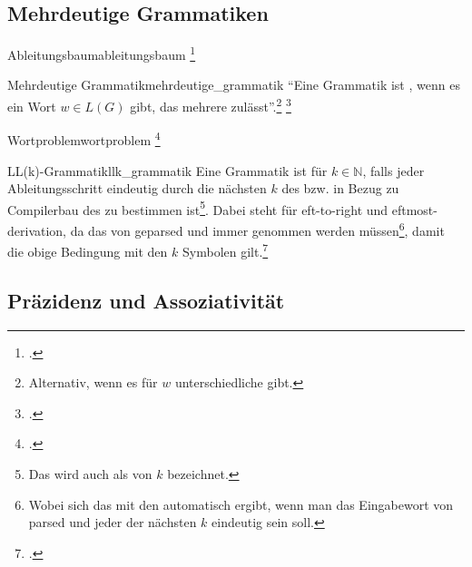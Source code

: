 \subsection{Mehrdeutige Grammatiken}
\begin{Definition}{Ableitungsbaum}{ableitungsbaum}
  \footcite{nebel_theoretische_2020}
\end{Definition}
\begin{Definition}{Mehrdeutige Grammatik}{mehrdeutige_grammatik}
  \enquote{Eine Grammatik ist , wenn es ein Wort $w\in L(G)$ gibt, das mehrere  zulässt}.\footnote{Alternativ, wenn es für $w$  unterschiedliche  gibt.}
  \footcite{nebel_theoretische_2020}
\end{Definition}

\begin{Definition}{Wortproblem}{wortproblem}
  \footcite{nebel_theoretische_2020}
\end{Definition}
\begin{Definition}{LL(k)-Grammatik}{llk_grammatik}
  Eine Grammatik ist  für $k\in\mathbb{N}$, falls jeder Ableitungsschritt eindeutig durch die nächsten $k$  des  bzw. in Bezug zu Compilerbau  des  zu bestimmen ist\footnote{Das wird auch als  von $k$ bezeichnet.}. Dabei steht  für eft-to-right und eftmost-derivation, da das  von  geparsed und immer  genommen werden müssen\footnote{Wobei sich das mit den  automatisch ergibt, wenn man das Eingabewort von   parsed und jeder der nächsten $k$  eindeutig sein soll.}, damit die obige Bedingung mit den  $k$ Symbolen gilt.\footcite{nebel_theoretische_2020}
\end{Definition}

\subsection{Präzidenz und Assoziativität}

